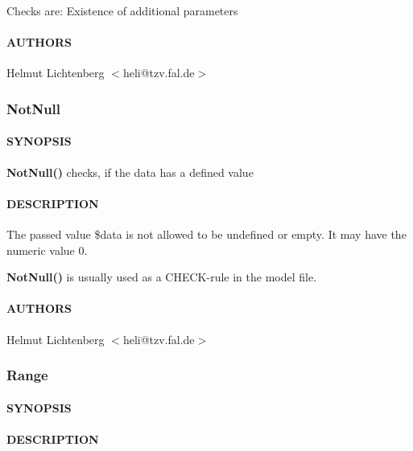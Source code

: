 Checks are:
   Existence of additional parameters

\paragraph*{AUTHORS\label{NoNumber_AUTHORS}}


Helmut Lichtenberg $<$heli@tzv.fal.de$>$

\subsubsection{NotNull\label{NotNull}}




\paragraph*{SYNOPSIS\label{NotNull_SYNOPSIS}}


\textbf{NotNull()} checks, if the data has a defined value

\paragraph*{DESCRIPTION\label{NotNull_DESCRIPTION}}


The passed value \$data is not allowed to be undefined or empty. It may have
the numeric value 0.



\textbf{NotNull()} is usually used as a CHECK-rule in the model file.

\paragraph*{AUTHORS\label{NotNull_AUTHORS}}


Helmut Lichtenberg $<$heli@tzv.fal.de$>$

\subsubsection{Range\label{Range}}




\paragraph*{SYNOPSIS\label{Range_SYNOPSIS}}
\paragraph*{DESCRIPTION\label{Range_DESCRIPTION}}


